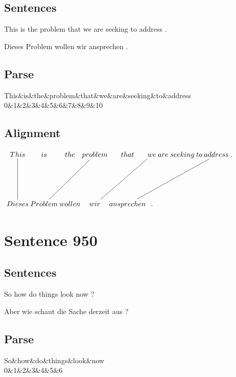 \documentclass{report}
\begin{document}
\subsection*{Sentences}
This is the problem that we are seeking to address .

\noindent Dieses Problem wollen wir ansprechen .



\subsection*{Parse}
\begin{dependency}[theme=simple]
\begin{deptext}[column sep=.5cm, row sep=.1ex]
This\&is\&the\&problem\&that\&we\&are\&seeking\&to\&address\\
0\&1\&2\&3\&4\&5\&6\&7\&8\&9\&10\\
\end{deptext}
\end{dependency}


\subsection*{Alignment}
\scriptsize{
$
\xymatrix@C-2.3pc{
This \ar @{-} [dd] & is & the & problem \ar @{-} [ddll] & that & we \ar @{-} [ddll] & are & seeking & to & address \ar @{-} [ddlllll] & .\\\\
Dieses & Problem & wollen & wir & ansprechen & .
}$}
\newpage\section*{Sentence 950}

\subsection*{Sentences}
So how do things look now ?

\noindent Aber wie schaut die Sache derzeit aus ?



\subsection*{Parse}
\begin{dependency}[theme=simple]
\begin{deptext}[column sep=.5cm, row sep=.1ex]
So\&how\&do\&things\&look\&now\\
0\&1\&2\&3\&4\&5\&6\\
\end{deptext}
\end{dependency}
\end{document}
